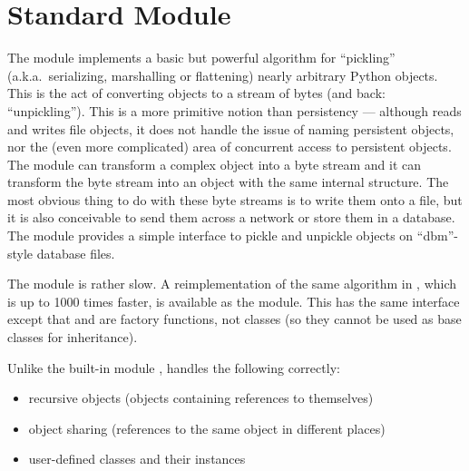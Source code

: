 \section{Standard Module }
\label{module-pickle}


The  module implements a basic but powerful algorithm for
``pickling'' (a.k.a.\ serializing, marshalling or flattening) nearly
arbitrary Python objects.  This is the act of converting objects to a
stream of bytes (and back: ``unpickling'').
This is a more primitive notion than
persistency --- although  reads and writes file objects,
it does not handle the issue of naming persistent objects, nor the
(even more complicated) area of concurrent access to persistent
objects.  The  module can transform a complex object into
a byte stream and it can transform the byte stream into an object with
the same internal structure.  The most obvious thing to do with these
byte streams is to write them onto a file, but it is also conceivable
to send them across a network or store them in a database.  The module
 provides a simple interface to pickle and unpickle
objects on ``dbm''-style database files.

 The  module is rather slow.  A
reimplementation of the same algorithm in \C{}, which is up to 1000 times
faster, is available as the 
module.  This has the same interface except that  and
 are factory functions, not classes (so they cannot be
used as base classes for inheritance).

Unlike the built-in module ,  handles
the following correctly:

\begin{itemize}

\item recursive objects (objects containing references to themselves)

\item object sharing (references to the same object in different places)

\item user-defined classes and their instances

\end{itemize}


